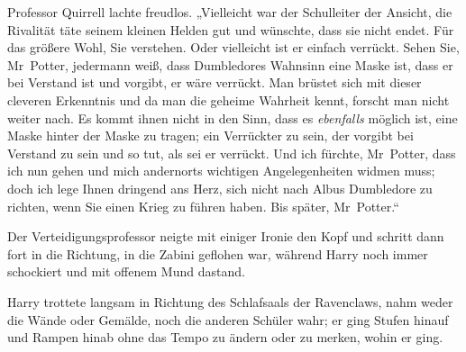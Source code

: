 Professor Quirrell lachte freudlos.
„Vielleicht war der Schulleiter der Ansicht, die Rivalität täte seinem kleinen Helden gut und wünschte, dass sie nicht endet. Für das größere Wohl, Sie verstehen. Oder vielleicht ist er einfach verrückt. Sehen Sie, Mr~Potter, jedermann weiß, dass Dumbledores Wahnsinn eine Maske ist, dass er bei Verstand ist und vorgibt, er wäre verrückt. Man brüstet sich mit dieser cleveren Erkenntnis und da man die geheime Wahrheit kennt, forscht man nicht weiter nach. Es kommt ihnen nicht in den Sinn, dass es \emph{ebenfalls} möglich ist, eine Maske hinter der Maske zu tragen; ein Verrückter zu sein, der vorgibt bei Verstand zu sein und so tut, als sei er verrückt. Und ich fürchte, Mr~Potter, dass ich nun gehen und mich andernorts wichtigen Angelegenheiten widmen muss; doch ich lege Ihnen dringend ans Herz, sich nicht nach Albus Dumbledore zu richten, wenn Sie einen Krieg zu führen haben. Bis später, Mr~Potter.“

Der Verteidigungsprofessor neigte mit einiger Ironie den Kopf und schritt dann fort in die Richtung, in die Zabini geflohen war, während Harry noch immer schockiert und mit offenem Mund dastand.


Harry trottete langsam in Richtung des Schlafsaals der Ravenclaws, nahm weder die Wände oder Gemälde, noch die anderen Schüler wahr; er ging Stufen hinauf und Rampen hinab ohne das Tempo zu ändern oder zu merken, wohin er ging.

